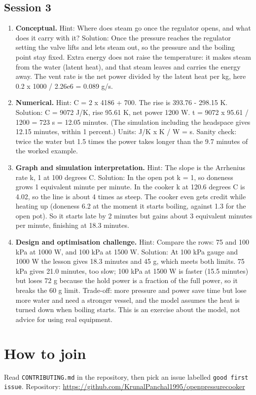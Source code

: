 \documentclass[11pt,a4paper]{article}
\begin{document}
\subsection*{Session 3}
\begin{enumerate}[nosep]
\item \textbf{Conceptual.} Hint: Where does steam go once the regulator opens, and what does it carry with it? Solution: Once the pressure reaches the regulator setting the valve lifts and lets steam out, so the pressure and the boiling point stay fixed. Extra energy does not raise the temperature: it makes steam from the water (latent heat), and that steam leaves and carries the energy away. The vent rate is the net power divided by the latent heat per kg, here 0.2 x 1000 / 2.26e6 = 0.089 g/s.
\item \textbf{Numerical.} Hint: C = 2 x 4186 + 700. The rise is 393.76 - 298.15 K. Solution: C = 9072 J/K, rise 95.61 K, net power 1200 W. t = 9072 x 95.61 / 1200 = 723 s = 12.05 minutes. (The simulation including the headspace gives 12.15 minutes, within 1 percent.) Units: J/K x K / W = s. Sanity check: twice the water but 1.5 times the power takes longer than the 9.7 minutes of the worked example.
\item \textbf{Graph and simulation interpretation.} Hint: The slope is the Arrhenius rate k, 1 at 100 degrees C. Solution: In the open pot k = 1, so doneness grows 1 equivalent minute per minute. In the cooker k at 120.6 degrees C is 4.02, so the line is about 4 times as steep. The cooker even gets credit while heating up (doneness 6.2 at the moment it starts boiling, against 1.3 for the open pot). So it starts late by 2 minutes but gains about 3 equivalent minutes per minute, finishing at 18.3 minutes.
\item \textbf{Design and optimisation challenge.} Hint: Compare the rows: 75 and 100 kPa at 1000 W, and 100 kPa at 1500 W. Solution: At 100 kPa gauge and 1000 W the lesson gives 18.3 minutes and 45 g, which meets both limits. 75 kPa gives 21.0 minutes, too slow; 100 kPa at 1500 W is faster (15.5 minutes) but loses 72 g because the hold power is a fraction of the full power, so it breaks the 60 g limit. Trade-off: more pressure and power save time but lose more water and need a stronger vessel, and the model assumes the heat is turned down when boiling starts. This is an exercise about the model, not advice for using real equipment.
\end{enumerate}

\section{How to join}
Read \texttt{CONTRIBUTING.md} in the repository, then pick an issue labelled \texttt{good first issue}. Repository: \url{https://github.com/KrunalPanchal1995/openpressurecooker}
\end{document}
